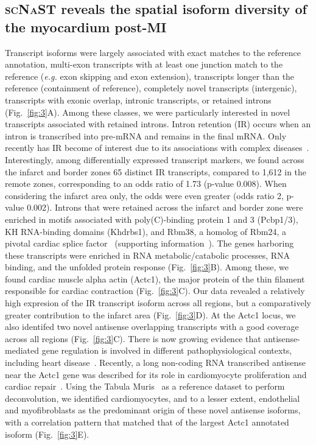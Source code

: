 \documentclass[utf8]{FrontiersinHarvard} %
\newcommand{\eg}{\textit{e.g.}\xspace}
\newcommand{\scnast}{\textsc{scNaST}\xspace}
\begin{document}
\subsection*{\scnast reveals the spatial isoform diversity of the myocardium post-MI}
Transcript isoforms were largely associated with exact matches to the reference annotation, multi-exon transcripts with at least one junction match to the reference (\eg exon skipping and exon extension), transcripts longer than the reference (containment of reference), completely novel transcripts (intergenic), transcripts with exonic overlap, intronic transcripts, or retained introns (Fig.~\ref{fig:3}A). 
Among these classes, we were particularly interested in novel transcripts associated with retained introns. Intron retention (IR) occurs when an intron is transcribed into pre-mRNA and remains in the final mRNA. Only recently has IR become of interest due to its associations with complex diseases~\citep{Zhang2020:IR_cancer}.
Interestingly, among differentially expressed transcript markers, we found across the infarct and border zones 65 distinct IR transcripts, compared to 1,612 in the remote zones, corresponding to an odds ratio of 1.73 (p-value 0.008). When considering the infarct area only, the odds were even greater (odds ratio 2, p-value 0.002).
Introns that were retained across the infarct and border zone were enriched in motifs associated with poly(C)-binding protein 1 and 3 (Pcbp1/3), KH RNA-binding domains (Khdrbs1), and Rbm38, a homolog of Rbm24, a pivotal cardiac splice factor~\citep{Weeland2015:AS_heart} (supporting information~).
The genes harboring these transcripts were enriched in RNA metabolic/catabolic processes, RNA binding, and the unfolded protein response (Fig.~\ref{fig:3}B).
Among these, we found cardiac muscle alpha actin (Actc1), the major protein of the thin filament responsible for cardiac contraction (Fig.~\ref{fig:3}C). 
Our data revealed a relatively high expresion of the IR transcript isoform across all regions, but a comparatively greater contribution to the infarct area (Fig.~\ref{fig:3}D).
At the Actc1 locus, we also identifed two novel antisense overlapping transcripts with a good coverage across all regions (Fig.~\ref{fig:3}C).
There is now growing evidence that antisense-mediated gene regulation is involved in different pathophysiological contexts, including heart disease~\citep{Luther2005:antisense_cardiac,Zinad2017:NATs,Celik2019:Nppa-AS}.
Recently, a long non-coding RNA transcribed antisense near the Actc1 gene was described for its role in cardiomyocyte proliferation and cardiac repair~\citep{Murugavel2019:lncPCR}.
Using the Tabula Muris~\citep{Schaum2018:Tabula_muris} as a reference dataset to perform deconvolution, we identified cardiomyocytes, and to a lesser extent, endothelial and myofibroblasts as the predominant origin of these novel antisense isoforms, with a correlation pattern that matched that of the largest Actc1 annotated isoform (Fig.~\ref{fig:3}E).
\end{document}
